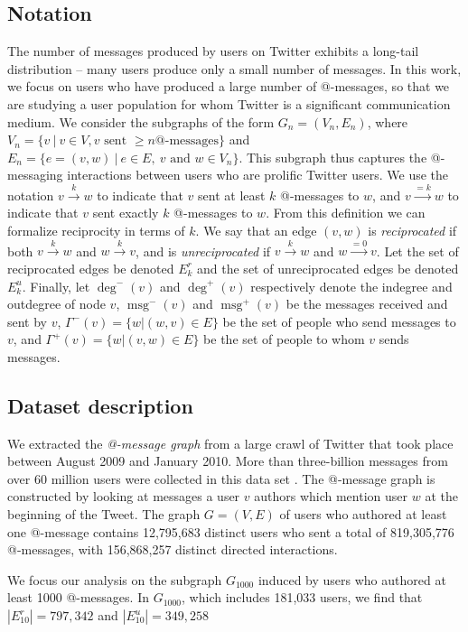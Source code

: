 \documentclass[conference]{IEEEtran}
\begin{document}
\subsection{Notation}
The number of messages produced by users on 
Twitter exhibits a long-tail distribution -- many users produce only a small number of messages.
In this work, we focus on users who have produced 
a large number of @-messages, so that we are studying 
a user population for whom Twitter is a significant communication medium.
We consider the subgraphs of the form $G_n = (V_n, E_n)$, where $V_n = \{v~|~v \in V, v \text{ sent } \ge n \text{@-messages}\}$ and $E_n = \{e=(v,w)~|~e \in E,~v \text{ and } w \in V_n\}$.
This subgraph thus captures the @-messaging interactions between users who are prolific Twitter users.
We use the notation $v \xrightarrow{k} w$ to indicate that $v$ sent at least $k$ @-messages to $w$, and $v \xrightarrow{=k} w$ to indicate that $v$ sent exactly $k$ @-messages to $w$. 
From this definition we can formalize reciprocity in terms of $k$. 
We say that an edge $(v,w)$ is {\em reciprocated} 
if both $v \xrightarrow{k} w$ and $w \xrightarrow{k} v$, and 
is {\em unreciprocated} if $v \xrightarrow{k} w$ and $w \xrightarrow{=0} v$.
Let the set of reciprocated edges be denoted $E_k^r$
and the set of unreciprocated edges be denoted $E_k^u$.
Finally, let $\deg^-(v)$ and $\deg^+(v)$ respectively denote the indegree and outdegree of node $v$, $\operatorname{msg}^-(v)$ and $\operatorname{msg}^+(v)$ be the messages received and sent by $v$, $\Gamma^-(v) = \{w| (w,v) \in E\}$ be the set of people who send messages to $v$, and $\Gamma^+(v) = \{w| (v,w) \in E\}$ be the set of people to whom $v$ sends messages.

\subsection{Dataset description}
We extracted the \emph{@-message graph} from a large crawl of Twitter that took place between August 2009 and January 2010.  More than three-billion messages from over 60 million users were collected in this data set \cite{Romero:2011:DMI:1963405.1963503}.
The @-message graph is constructed by looking at messages a user $v$ authors which mention user $w$ at the beginning of the Tweet.  
The graph $G = (V,E)$ of users who authored at least one @-message 
contains 12,795,683 distinct users who sent a total 
of 819,305,776 @-messages, with 156,868,257 distinct directed interactions. 

We focus our analysis on the subgraph $G_{1000}$ induced by users who authored at least 1000 @-messages.
In $G_{1000}$, which includes 181,033 users, we find that $|E^r_{10}| = 797,342$ and $|E^u_{10}| = 349,258$
\end{document}

